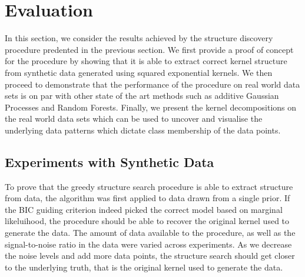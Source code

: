 \documentclass[a4paper,12pt ]{report}
\begin{document}

   



\clearpage


\chapter{Evaluation} 

In this section, we consider the results achieved by the structure discovery procedure predented in the previous section. We first provide a proof of concept for the procedure by showing that it is able to extract correct kernel structure from synthetic data generated using squared
exponential kernels. We then proceed to demonstrate that the performance of the procedure on real world data sets is on par with other state of the art methods such as additive Gaussian Processes and Random Forests. Finally, we present the kernel decompositions on the real
world data sets which can be used to uncover and visualise the underlying data patterns which dictate class membership of the data points. 

\section{Experiments with Synthetic Data}

To prove that the greedy structure search procedure is able to extract structure from data, the algorithm was first applied to data drawn from a single \gp{} prior. If the BIC guiding criterion indeed picked the correct 
model based on marginal likeluihood, the procedure should be able to recover the original kernel used to generate the data. The amount of data available to the procedure, as well as the signal-to-noise ratio in the data were varied across experiments. 
As we decrease the noise levels and add more data points, the structure search should get closer to the underlying truth, that is the original kernel used to generate the data.
\end{document}
